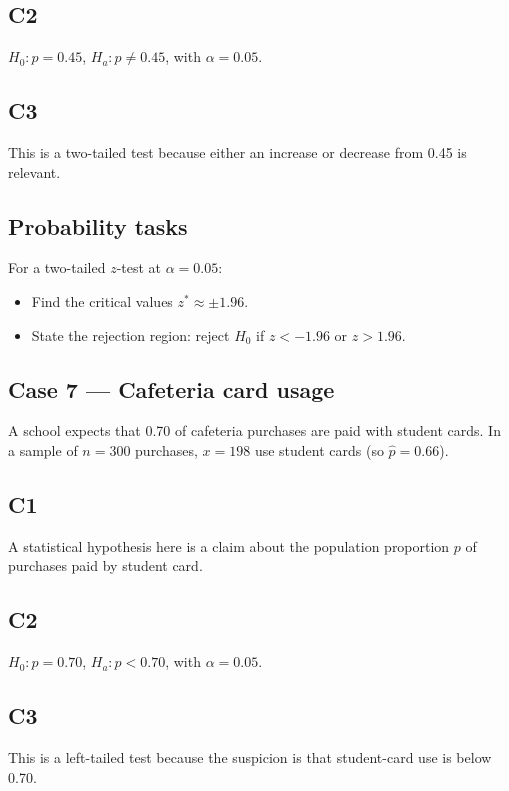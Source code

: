 \begin{ExamProblems}
		\subsection*{C2}
		\(H_0\colon p=0.45\), \(H_a\colon p\neq 0.45\), with \(\alpha=0.05\).

		\subsection*{C3}
		This is a two-tailed test because either an increase or decrease from 0.45 is relevant.

		\subsection*{Probability tasks}
		For a two-tailed \(z\)-test at \(\alpha=0.05\):
		\begin{itemize}
			\item Find the critical values \(z^*\approx \pm 1.96\).
			\item State the rejection region: reject \(H_0\) if \(z<-1.96\) or \(z>1.96\).
		\end{itemize}

		\item
		\subsection*{Case 7 — Cafeteria card usage}
		A school expects that 0.70 of cafeteria purchases are paid with student cards. In a sample of \(n=300\) purchases, \(x=198\) use student cards (so \(\hat p=0.66\)).

		\subsection*{C1}
		A statistical hypothesis here is a claim about the population proportion \(p\) of purchases paid by student card.

		\subsection*{C2}
		\(H_0\colon p=0.70\), \(H_a\colon p<0.70\), with \(\alpha=0.05\).

		\subsection*{C3}
		This is a left-tailed test because the suspicion is that student-card use is below 0.70.


\end{ExamProblems}
